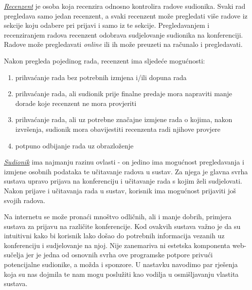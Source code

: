 		
		\underline{\textit{Recenzent}} je osoba koja recenzira odnosno kontrolira radove sudionika. Svaki rad pregledava samo jedan recenzent, a svaki recenzent može pregledati više radove iz sekcije koju odabere pri prijavi i samo iz te sekcije. Pregledavanjem i recenziranjem radova recenzent odobrava sudjelovanje sudionika na konferenciji. Radove može pregledavati \textit{online} ili ih može preuzeti na računalo i pregledavati. 
		
		Nakon pregleda pojedinog rada, recenzent ima sljedeće mogućnosti:
		
		\begin{enumerate}
			
			\item prihvaćanje rada bez potrebnih izmjena i/ili dopuna rada
			\item prihvaćanje rada, ali sudionik prije finalne predaje mora napraviti manje dorade koje recenzent ne mora provjeriti
			\item prihvaćanje rada, ali uz potrebne značajne izmjene rada o kojima, nakon izvršenja, sudionik mora obavijestiti recenzenta radi njihove provjere
			\item potpuno odbijanje rada uz obrazloženje
			
		\end{enumerate}
	
		\underline{\textit{Sudionik}} ima najmanju razinu ovlasti - on jedino ima mogućnost pregledavanja i izmjene osobnih podataka te učitavanje radova u sustav. Za njega je glavna svrha sustava upravo prijava na konferenciju i učitavanje rada s kojim želi sudjelovati. Nakon prijave i učitavanja rada u sustav, korisnik ima mogućnost prijaviti još svojih radova.
		
		Na internetu se može pronaći mnoštvo odličnih, ali i manje dobrih, primjera sustava za prijavu na različite konferencije. Kod ovakvih sustava važno je da su intuitivni kako bi korisnik lako došao do potrebnih informacija vezanih uz konferenciju i sudjelovanje na njoj. Nije zanemariva ni estetska komponenta web-sučelja jer je jedna od osnovnih svrha ove programske potpore privući potencijalne sudionike, a možda i sponzore. U nastavku navodimo par rješenja koja su nas dojmila te nam mogu poslužiti kao vodilja u osmišljavanju vlastita sustava.
	
		\eject
		
	